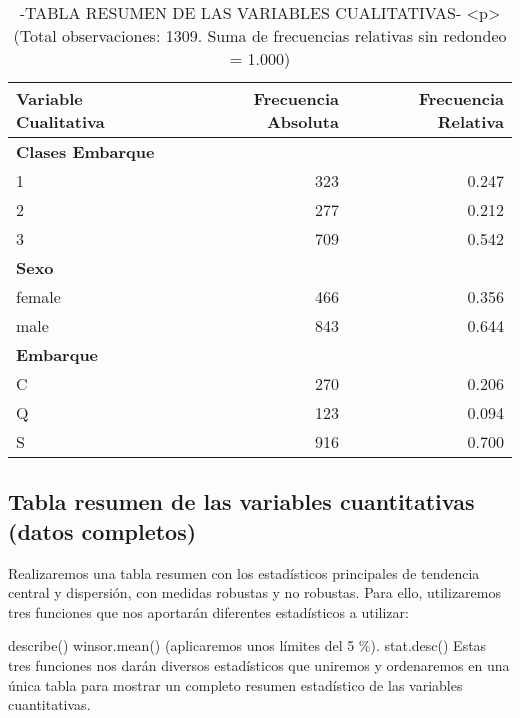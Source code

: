 \documentclass[
]{article}
\begin{document}
\begin{table}

\caption{\label{tab:unnamed-chunk-92}-TABLA RESUMEN DE LAS VARIABLES CUALITATIVAS-
      <p> (Total observaciones: 1309. Suma de frecuencias relativas sin redondeo = 1.000)}
\centering
\begin{tabular}[t]{l|r|r}
\hline
Variable Cualitativa & Frecuencia Absoluta & Frecuencia Relativa\\
\hline
\multicolumn{3}{l}{\textbf{Clases Embarque}}\\
\hline
\hspace{1em}1 & 323 & 0.247\\
\hline
\hspace{1em}2 & 277 & 0.212\\
\hline
\hspace{1em}3 & 709 & 0.542\\
\hline
\multicolumn{3}{l}{\textbf{Sexo}}\\
\hline
\hspace{1em}female & 466 & 0.356\\
\hline
\hspace{1em}male & 843 & 0.644\\
\hline
\multicolumn{3}{l}{\textbf{Embarque}}\\
\hline
\hspace{1em}C & 270 & 0.206\\
\hline
\hspace{1em}Q & 123 & 0.094\\
\hline
\hspace{1em}S & 916 & 0.700\\
\hline
\end{tabular}
\end{table}

\hypertarget{tabla-resumen-de-las-variables-cuantitativas-datos-completos}{%
\subsection{Tabla resumen de las variables cuantitativas (datos
completos)}\label{tabla-resumen-de-las-variables-cuantitativas-datos-completos}}

Realizaremos una tabla resumen con los estadísticos principales de
tendencia central y dispersión, con medidas robustas y no robustas. Para
ello, utilizaremos tres funciones que nos aportarán diferentes
estadísticos a utilizar:

describe() winsor.mean() (aplicaremos unos límites del 5 \%).
stat.desc() Estas tres funciones nos darán diversos estadísticos que
uniremos y ordenaremos en una única tabla para mostrar un completo
resumen estadístico de las variables cuantitativas.
\end{document}
